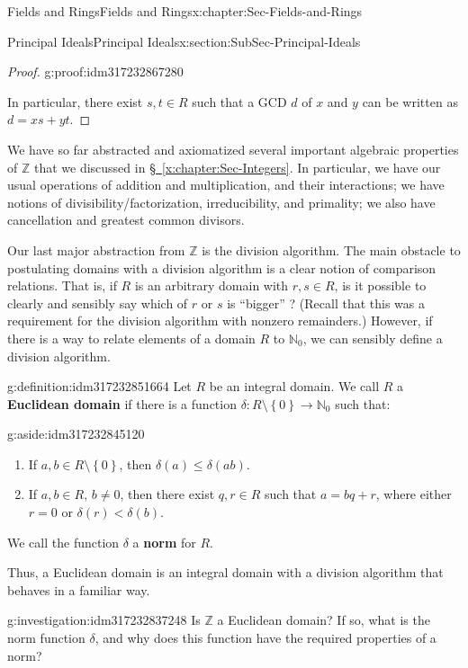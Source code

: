 \documentclass[oneside,10pt,]{book}
\newcommand{\xreffont}{\relax}
\newcommand{\terminology}[1]{\textbf{#1}}
\numberwithin{equation}{section}
\renewcommand{\le}{\leqslant}
\newcommand{\set}[1]{\left\{ {#1} \right\}}
\def\Z{{\mathbb Z}}
\def\N{{\mathbb N}}
\newcommand{\lt}{<}
\begin{document}
\begin{chapterptx}{Fields and Rings}{}{Fields and Rings}{}{}{x:chapter:Sec-Fields-and-Rings}
\begin{sectionptx}{Principal Ideals}{}{Principal Ideals}{}{}{x:section:SubSec-Principal-Ideals}
\begin{proof}{}{g:proof:idm317232867280}
\par
In particular, there exist \(s,t\in R\) such that a GCD \(d\) of \(x\) and \(y\) can be written as \(d = xs + yt\).%
\end{proof}
We have so far abstracted and axiomatized several important algebraic properties of \(\Z\) that we discussed in \hyperref[x:chapter:Sec-Integers]{§~{\xreffont\ref{x:chapter:Sec-Integers}}}. In particular, we have our usual operations of addition and multiplication, and their interactions; we have notions of divisibility\slash{}factorization, irreducibility, and primality; we also have cancellation and greatest common divisors.%
\par
Our last major abstraction from \(\Z\) is the division algorithm. The main obstacle to postulating domains with a division algorithm is a clear notion of comparison relations. That is, if \(R\) is an arbitrary domain with \(r,s\in R\), is it possible to clearly and sensibly say which of \(r\) or \(s\) is ``bigger'' ? (Recall that this was a requirement for the division algorithm with nonzero remainders.) However, if there is a way to relate elements of a domain \(R\) to \(\N_0\), we can sensibly define a division algorithm.%
\begin{definition}{}{g:definition:idm317232851664}%
Let \(R\) be an integral domain. We call \(R\) a \terminology{Euclidean domain} if there is a function \(\delta : R\setminus \set{0} \to \N_0\) such that: \begin{aside}{}{g:aside:idm317232845120}%
\end{aside}
\textbraceright{}%
\begin{enumerate}
\item{}If \(a,b\in R\setminus \set{0}\), then \(\delta(a) \le \delta(ab)\).%
\item{}If \(a,b\in R\), \(b\ne 0\), then there exist \(q,r\in R\) such that \(a = bq+r\), where either \(r = 0\) or \(\delta(r) \lt \delta(b)\).%
\end{enumerate}
%
\par
We call the function \(\delta\) a \terminology{norm} for \(R\).%
\end{definition}
Thus, a Euclidean domain is an integral domain with a division algorithm that behaves in a familiar way.%
\begin{investigation}{}{g:investigation:idm317232837248}%
Is \(\Z\) a Euclidean domain? If so, what is the norm function \(\delta\), and why does this function have the required properties of a norm?%
\par\smallskip%

\end{investigation}
\end{sectionptx}
\end{chapterptx}
\end{document}
